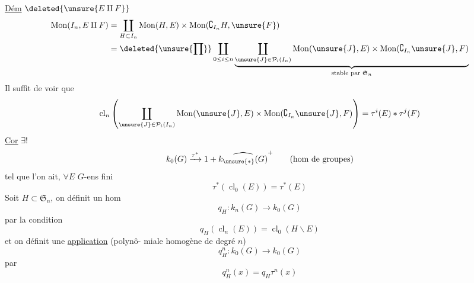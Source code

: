 \uline{Dém} $\deleted{\unsure{E\amalg F}}$
\[
\begin{aligned}
\operatorname{Mon}(I_n,E\amalg F)&=\coprod_{H\subset I_n}\operatorname{Mon}(H,E)\times\operatorname{Mon}(\complement_{I_n}H,\unsure{F})\\
&=\deleted{\unsure{\prod}}\coprod_{0\leq i\leq n}\underbrace{\coprod_{\unsure{J}\in\mathcal P_i(I_n)}\operatorname{Mon}(\unsure{J},E)\times\operatorname{Mon}(\complement_{I_n}\unsure{J},F)}_{\text{stable par }\mathfrak S_n}
\end{aligned}
\]
Il suffit de voir que
\[
\operatorname{cl}_n\left(\coprod_{\unsure{J}\in\mathcal P_i(I_n)}\operatorname{Mon}(\unsure{J},E)\times\operatorname{Mon}(\complement_{I_n}\unsure{J},F)\right)=\tau^i(E)*\tau^j(F)
\]
\uline{Cor} $\exists!$
\[
k_0(G)\xrightarrow{\tau^*}1+\widehat{k_{\unsure{*}}(G)}^+\qquad(\text{hom de groupes})
\]
tel que l'on ait, $\forall E$ $G$-ens fini
\[
\tau^*(\operatorname{cl}_0(E))=\tau^*(E)
\]
Soit $H\subset\mathfrak S_n$,  on définit un hom
\[
q_H:k_n(G)\longrightarrow k_0(G)
\]
par la condition
\[
q_H(\operatorname{cl}_n(E))=\operatorname{cl}_0(H\backslash E)
\]
et on définit une  \uline{application} (polynô-
miale homogène de degré $n$)
\[
q_H^n:k_0(G)\longrightarrow k_0(G)
\]
par
\[
q_H^n(x)=q_H\tau^n(x)
\]
